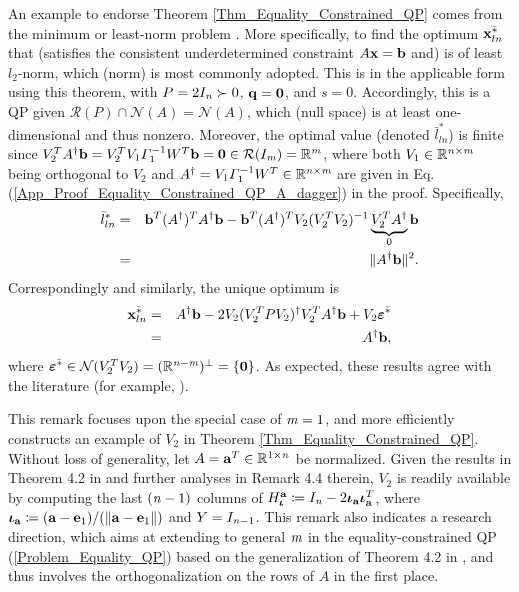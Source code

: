 \documentclass{imaman}
\newcommand{\beq}{\begin{eqnarray}}
\newcommand{\eeq}{\end{eqnarray}}
\newcommand{\bfa}{{\bf a}}
\newcommand{\bfb}{{\bf b}}
\newcommand{\bfx}{{\bf x}}
\newcommand{\bfq}{{\bf q}}
\newcommand{\bfe}{{\bf e}}
\newcommand{\bfiota}{{\boldsymbol \iota}}
\newcommand{\bfvarepsilon}{{\boldsymbol \varepsilon}}
\newcommand{\bfzero}{{\bf 0}}
\newcommand{\real}{\mathbb{R}}
\newcommand{\calN}{{\mathcal N}}
\newcommand{\calR}{{\mathcal R}}
\newcommand{\itm}{{\it m}}
\newcommand{\itn}{{\it n}}
\numberwithin{equation}{section}
\begin{document}
\begin{remark}
An example to endorse Theorem \ref{Thm_Equality_Constrained_QP} comes from the minimum or least-norm problem \citep{BoVa:04,GoVa:13}. More specifically, to find the optimum $\bfx^{\bar *}_{ln}$ that (satisfies the consistent underdetermined constraint $A\bfx=\bfb$ and) is of least $l_2$-norm, which (norm) is most commonly adopted. This is in the applicable form using this theorem, with $P=2I_\itn\succ 0$, $\bfq=\bfzero$, and $s=0$. Accordingly, this is a QP given $\calR(P)\cap\calN(A)=\calN(A)$, which (null space) is at least one-dimensional and thus nonzero. Moreover, the optimal value (denoted $\bar l^*_{ln}$) is finite since $V_2^TA^\dagger\bfb=V_2^TV_1\Gamma_1^{-1}W^T\bfb=\bfzero\in\calR(I_{\itm})=\real^\itm$, where both $V_1\in\real^{\itn\times\itm}$ being orthogonal to $V_2$ and $A^\dagger=V_1\Gamma_1^{-1}W^T\in\real^{\itn\times\itm}$ are given in Eq. (\ref{App_Proof_Equality_Constrained_QP_A_dagger}) in the proof. Specifically,
\beq
\bar l^*_{ln}&=&\bfb^T(A^\dagger)^TA^\dagger\bfb-\bfb^T(A^\dagger)^TV_2(V_2^TV_2)^{-1} \underbrace{V_2^TA^\dagger}_\text{$0$}\bfb\nonumber\\
&=&\Vert A^\dagger\bfb\Vert^2.\nonumber
\eeq
Correspondingly and similarly, the unique optimum is
\beq
\bfx^{\bar *}_{ln}&=&A^\dagger\bfb-2V_2(V_2^TPV_2)^\dagger V_2^TA^\dagger\bfb+V_2\bfvarepsilon^{\bar *}\nonumber\\
&=&A^\dagger\bfb,
\eeq
where $\bfvarepsilon^{\bar *}\in\calN(V_2^TV_2)=(\real^{\itn-\itm})^\perp=\{\bfzero\}$. As expected, these results agree with the literature (for example, \cite{BoVa:04}).
\label{Rem_Least_Norm}
\end{remark}

\begin{remark}
This remark focuses upon the special case of $\itm=1$, and more efficiently constructs an example of $V_2$ in Theorem \ref{Thm_Equality_Constrained_QP}. Without loss of generality, let $A=\bfa^T\in\real^{1\times\itn}$ be normalized. Given the results in Theorem 4.2 in \cite{LiLiHs:20} and further analyses in Remark 4.4 therein, $V_2$ is readily available by computing the last $(\itn-1)$ columns of $H_\bfiota^\bfa\coloneqq I_\itn-2\bfiota_\bfa\bfiota_\bfa^T$, where $\bfiota_\bfa\coloneqq (\bfa-\bfe_1)/(\Vert\bfa-\bfe_1\Vert)$ and $Y=I_{\itn-1}$. This remark also indicates a research direction, which aims at extending to general $\itm$ in the equality-constrained QP (\ref{Problem_Equality_QP}) based on the generalization of Theorem 4.2 in \cite{LiLiHs:20}, and thus involves the orthogonalization on the rows of $A$ in the first place.
\label{Rem_Thm_Equality_Constrained_QP_m_1}
\end{remark}
\end{document}
